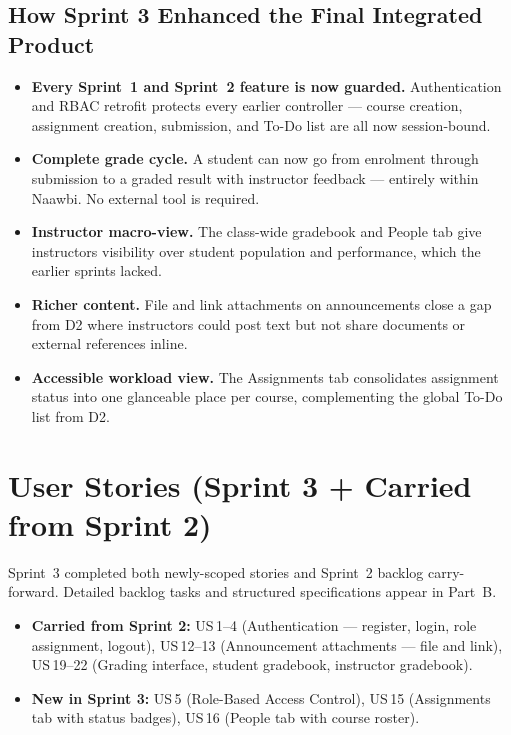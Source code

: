 \documentclass[12pt, a4paper]{article}
\begin{document}
\subsection{How Sprint 3 Enhanced the Final Integrated Product}

\begin{itemize}
  \item \textbf{Every Sprint~1 and Sprint~2 feature is now guarded.}
        Authentication and RBAC retrofit protects every earlier controller
        --- course creation, assignment creation, submission, and To-Do list
        are all now session-bound.
  \item \textbf{Complete grade cycle.} A student can now go from enrolment
        through submission to a graded result with instructor feedback ---
        entirely within Naawbi. No external tool is required.
  \item \textbf{Instructor macro-view.} The class-wide gradebook and People
        tab give instructors visibility over student population and
        performance, which the earlier sprints lacked.
  \item \textbf{Richer content.} File and link attachments on announcements
        close a gap from D2 where instructors could post text but not share
        documents or external references inline.
  \item \textbf{Accessible workload view.} The Assignments tab consolidates
        assignment status into one glanceable place per course, complementing
        the global To-Do list from D2.
\end{itemize}

\section{User Stories (Sprint 3 + Carried from Sprint 2)}
\label{sec:sprint3-stories}

Sprint~3 completed both newly-scoped stories and Sprint~2 backlog
carry-forward. Detailed backlog tasks and structured specifications appear in
Part~B.

\begin{itemize}
  \item \textbf{Carried from Sprint 2:} US\,1--4 (Authentication --- register, login, role assignment, logout), US\,12--13 (Announcement attachments --- file and link), US\,19--22 (Grading interface, student gradebook, instructor gradebook).
  \item \textbf{New in Sprint 3:} US\,5 (Role-Based Access Control), US\,15 (Assignments tab with status badges), US\,16 (People tab with course roster).
\end{itemize}
\end{document}
